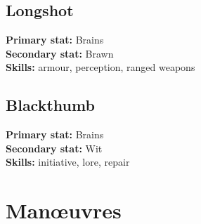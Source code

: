 \documentclass[10pt, a4paper, twocolumn]{article}
\begin{document}
\subsection{Longshot}
\textbf{Primary stat:} Brains\\
\textbf{Secondary stat:} Brawn\\
\textbf{Skills:} armour, perception, ranged weapons
\subsection{Blackthumb}
\textbf{Primary stat:} Brains\\
\textbf{Secondary stat:} Wit\\
\textbf{Skills:} initiative, lore, repair

\section{Man\oe{}uvres}
\end{document}
